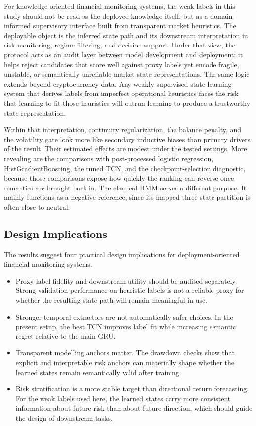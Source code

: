 \documentclass[a4paper,fleqn]{cas-dc}
\begin{document}
For knowledge-oriented financial monitoring systems, the weak labels in this study should not be read as the deployed knowledge itself, but as a domain-informed supervisory interface built from transparent market heuristics. The deployable object is the inferred state path and its downstream interpretation in risk monitoring, regime filtering, and decision support. Under that view, the protocol acts as an audit layer between model development and deployment: it helps reject candidates that score well against proxy labels yet encode fragile, unstable, or semantically unreliable market-state representations. The same logic extends beyond cryptocurrency data. Any weakly supervised state-learning system that derives labels from imperfect operational heuristics faces the risk that learning to fit those heuristics will outrun learning to produce a trustworthy state representation.

Within that interpretation, continuity regularization, the balance penalty, and the volatility gate look more like secondary inductive biases than primary drivers of the result. Their estimated effects are modest under the tested settings. More revealing are the comparisons with post-processed logistic regression, HistGradientBoosting, the tuned TCN, and the checkpoint-selection diagnostic, because those comparisons expose how quickly the ranking can reverse once semantics are brought back in. The classical HMM serves a different purpose. It mainly functions as a negative reference, since its mapped three-state partition is often close to neutral.

\subsection{Design Implications}
The results suggest four practical design implications for deployment-oriented financial monitoring systems.
\begin{itemize}
\item Proxy-label fidelity and downstream utility should be audited separately. Strong validation performance on heuristic labels is not a reliable proxy for whether the resulting state path will remain meaningful in use.
\item Stronger temporal extractors are not automatically safer choices. In the present setup, the best TCN improves label fit while increasing semantic regret relative to the main GRU.
\item Transparent modelling anchors matter. The drawdown checks show that explicit and interpretable risk anchors can materially shape whether the learned states remain semantically valid after training.
\item Risk stratification is a more stable target than directional return forecasting. For the weak labels used here, the learned states carry more consistent information about future risk than about future direction, which should guide the design of downstream tasks.
\end{itemize}
\end{document}
